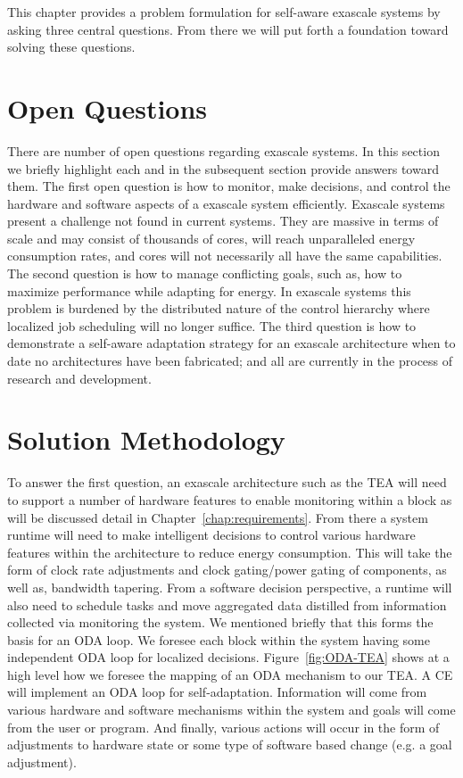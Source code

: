 \label{chap:problem_formulation}
This chapter provides a problem formulation for self-aware exascale systems by asking three central questions. From there we will put forth a foundation toward solving these questions.

\section{Open Questions}
    There are number of open questions regarding exascale systems. In this section we briefly highlight each and in the subsequent section provide answers toward them. The first open question is how to monitor, make decisions, and control the hardware and software aspects of a exascale system efficiently. Exascale systems present a challenge not found in current systems. They are massive in terms of scale and may consist of thousands of cores, will reach unparalleled energy consumption rates, and cores will not necessarily all have the same capabilities. The second question is how to manage conflicting goals, such as, how to maximize performance while adapting for energy. In exascale systems this problem is burdened by the distributed nature of the control hierarchy where localized job scheduling will no longer suffice. The third question is how to demonstrate a self-aware adaptation strategy for an exascale architecture when to date no architectures have been fabricated; and all are currently in the process of research and development.

\section{Solution Methodology}
    To answer the first question, an exascale architecture such as the TEA will need to support a number of hardware features to enable monitoring within a block as will be discussed detail in Chapter~\ref{chap:requirements}. From there a system runtime will need to make intelligent decisions to control various hardware features within the architecture to reduce energy consumption. This will take the form of clock rate adjustments and clock gating/power gating of components, as well as, bandwidth tapering. From a software decision perspective, a runtime will also need to schedule tasks and move aggregated data distilled from information collected via monitoring the system. We mentioned briefly that this forms the basis for an ODA loop. We foresee each block within the system having some independent ODA loop for localized decisions. Figure~\ref{fig:ODA-TEA} shows at a high level how we foresee the mapping of an ODA mechanism to our TEA. A CE will implement an ODA loop for self-adaptation. Information will come from various hardware and software mechanisms within the system and goals will come from the user or program. And finally, various actions will occur in the form of adjustments to hardware state or some type of software based change (e.g. a goal adjustment).

